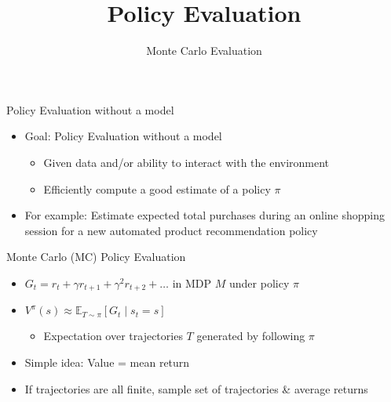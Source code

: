 


\title[Reinforcement Learning: Policy Evaluation]{Policy Evaluation}
\subtitle{Monte Carlo Evaluation}




	
	\maketitle

\begin{frame}[c]{Policy Evaluation without a model}

\begin{itemize}
	\item Goal: Policy Evaluation without a model
	\begin{itemize}
		\item  	Given data and/or ability to interact with the environment
		\item Efficiently compute a good estimate of a policy $\pi$
	\end{itemize}
	\smallskip
	\item For example: Estimate expected total purchases during an online shopping
	session for a new automated product recommendation policy
\end{itemize}



\end{frame}
\begin{frame}[c]{Monte Carlo (MC) Policy Evaluation}

\begin{itemize}
	\item $G_t = r_t + \gamma r_{t+1} + \gamma^2 r_{t+2} + \ldots$ in MDP $M$ under policy $\pi$
	\smallskip
	\item $V^\pi(s) \approx \mathbb{E}_{T \sim \pi} [G_t \mid s_t = s]$
	\begin{itemize}
		\item Expectation over trajectories $T$ generated by following $\pi$
	\end{itemize}
 	\smallskip
	\item Simple idea: Value = mean return
	\item If trajectories are all finite, sample set of trajectories \& average returns
\end{itemize}

\end{frame}
